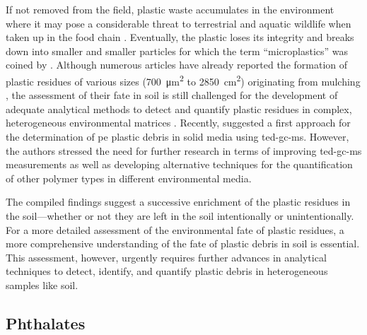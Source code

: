 If not removed from the field, plastic waste accumulates in the environment where it may pose a considerable threat to terrestrial and aquatic wildlife when taken up in the food chain \citep{BarnesAccumulation2009,DuisMicroplastics2016,RilligMicroplastic2012,SivanNew2011,TeutenTransport2009}. Eventually, the plastic loses its integrity and breaks down into smaller and smaller particles for which the term ``microplastics'' was coined by \citet{ThompsonLost2004}. Although numerous articles have already reported the formation of plastic residues of various sizes (\SI{700}{\square\micro\meter} to \SI{2850}{\square\centi\meter}) originating from mulching \citep[for example,][]{BriassoulisAnalysis2015,FeuilloleyDegradation2005,KyrikouBiodegradation2007,RamosPolyethylene2015}, the assessment of their fate in soil is still challenged for the development of adequate analytical methods to detect and quantify plastic residues in complex, heterogeneous environmental matrices \citep{RilligMicroplastic2012}. Recently, \citet{DumichenAnalysis2015} suggested a first approach for the determination of \ac{pe} plastic debris in solid media using \ac{ted-gc-ms}. However, the authors stressed the need for further research in terms of improving \ac{ted-gc-ms} measurements as well as developing alternative techniques for the quantification of other polymer types in different environmental media.

The compiled findings suggest a successive enrichment of the plastic residues in the soil---whether or not they are left in the soil intentionally or unintentionally. For a more detailed assessment of the environmental fate of plastic residues, a more comprehensive understanding of the fate of plastic debris in soil is essential. This assessment, however, urgently requires further advances in analytical techniques to detect, identify, and quantify plastic debris in heterogeneous samples like soil.

\subsection{Phthalates}
\label{sec:plastic-mulching:phthalates}

